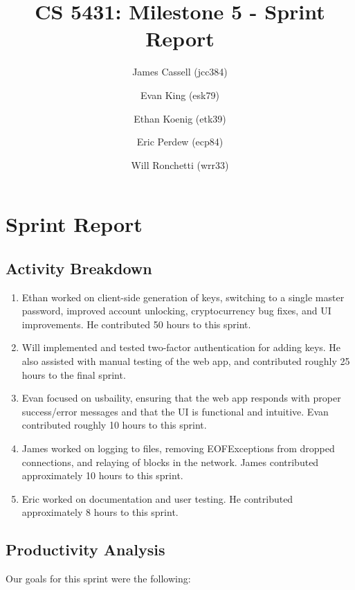 \documentclass[a4paper,12pt]{article}
\title{CS 5431: Milestone 5 - Sprint Report}
\author{
James Cassell (jcc384)
\and
Evan King (esk79)
\and
Ethan Koenig (etk39)
\and
Eric Perdew (ecp84)
\and
Will Ronchetti (wrr33)
}
\begin{document}
\maketitle

\section{Sprint Report}

\subsection{Activity Breakdown}

\begin{enumerate} %
\item Ethan worked on client-side generation of keys, switching to a single master password, improved account unlocking, cryptocurrency bug fixes, and UI improvements. He contributed 50 hours to this sprint.
\item Will implemented and tested two-factor authentication for adding keys. He also assisted with manual testing of the web app, and contributed roughly 25 hours to the final sprint.
\item Evan focused on usbaility, ensuring that the web app responds with proper success/error messages and that the UI is functional and intuitive. Evan contributed roughly 10 hours to this sprint.
\item James worked on logging to files, removing EOFExceptions from dropped connections, and relaying of blocks in the network.
    James contributed approximately 10 hours to this sprint.
\item Eric worked on documentation and user testing.
He contributed approximately 8 hours to this sprint.
\end{enumerate}

\subsection{Productivity Analysis}

Our goals for this sprint were the following:
\end{document}
